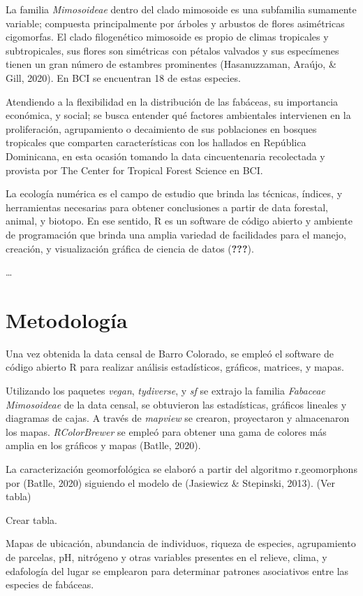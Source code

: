 \documentclass[11pt,]{article}
\begin{document}
La familia \emph{Mimosoideae} dentro del clado mimosoide es una
subfamilia sumamente variable; compuesta principalmente por árboles y
arbustos de flores asimétricas cigomorfas. El clado filogenético
mimosoide es propio de climas tropicales y subtropicales, sus flores son
simétricas con pétalos valvados y sus especímenes tienen un gran número
de estambres prominentes (Hasanuzzaman, Araújo, \& Gill, 2020). En BCI
se encuentran 18 de estas especies.

Atendiendo a la flexibilidad en la distribución de las fabáceas, su
importancia económica, y social; se busca entender qué factores
ambientales intervienen en la proliferación, agrupamiento o decaimiento
de sus poblaciones en bosques tropicales que comparten características
con los hallados en República Dominicana, en esta ocasión tomando la
data cincuentenaria recolectada y provista por The Center for Tropical
Forest Science en BCI.

La ecología numérica es el campo de estudio que brinda las técnicas,
índices, y herramientas necesarias para obtener conclusiones a partir de
data forestal, animal, y biotopo. En ese sentido, R es un software de
código abierto y ambiente de programación que brinda una amplia variedad
de facilidades para el manejo, creación, y visualización gráfica de
ciencia de datos ({\textbf{???}}).

\ldots

\section{Metodología}\label{metodologuxeda}

Una vez obtenida la data censal de Barro Colorado, se empleó el software
de código abierto R para realizar análisis estadísticos, gráficos,
matrices, y mapas.

Utilizando los paquetes \emph{vegan}, \emph{tydiverse}, y \emph{sf} se
extrajo la familia \emph{Fabaceae Mimosoideae} de la data censal, se
obtuvieron las estadísticas, gráficos lineales y diagramas de cajas. A
través de \emph{mapview} se crearon, proyectaron y almacenaron los
mapas. \emph{RColorBrewer} se empleó para obtener una gama de colores
más amplia en los gráficos y mapas (Batlle, 2020).

La caracterización geomorfológica se elaboró a partir del algoritmo
r.geomorphons por (Batlle, 2020) siguiendo el modelo de (Jasiewicz \&
Stepinski, 2013). (Ver tabla)

Crear tabla.

Mapas de ubicación, abundancia de individuos, riqueza de especies,
agrupamiento de parcelas, pH, nitrógeno y otras variables presentes en
el relieve, clima, y edafología del lugar se emplearon para determinar
patrones asociativos entre las especies de fabáceas.
\end{document}
